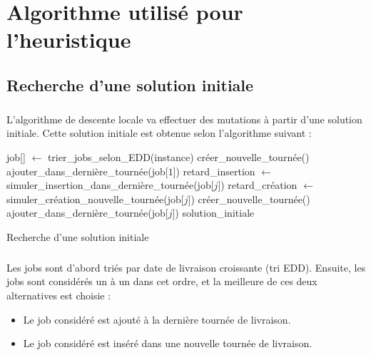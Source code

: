 \chapter{Algorithme utilisé pour l'heuristique}


\section{Recherche d'une solution initiale}

\paragraph{}
L'algorithme de descente locale va effectuer des mutations à partir d'une solution initiale.
Cette solution initiale est obtenue selon l'algorithme suivant :

\begin{algorithm}[H] %
\begin{algorithmic}
\STATE {}
\STATE job[] $ \leftarrow $ trier\_jobs\_selon\_EDD(instance)
\STATE {}
\STATE créer\_nouvelle\_tournée()
\STATE ajouter\_dans\_dernière\_tournée(job[$ 1 $])
\STATE {}
\STATE retard\_insertion $ \leftarrow $ simuler\_insertion\_dans\_dernière\_tournée(job[$ j $])
\STATE retard\_création $ \leftarrow $ simuler\_création\_nouvelle\_tournée(job[$ j $])
\STATE créer\_nouvelle\_tournée()
\ENDIF
\STATE ajouter\_dans\_dernière\_tournée(job[$ j $])
\ENDFOR
\RETURN solution\_initiale
\end{algorithmic}
\caption{\label{alg:solution-initiale}Recherche d'une solution initiale}
\end{algorithm}

\paragraph{}
Les jobs sont d'abord triés par date de livraison croissante (tri EDD).
Ensuite, les jobs sont considérés un à un dans cet ordre, et la meilleure de ces deux alternatives est choisie :
\begin{itemize}
\item Le job considéré est ajouté à la dernière tournée de livraison.
\item Le job considéré est inséré dans une nouvelle tournée de livraison.
\end{itemize}
